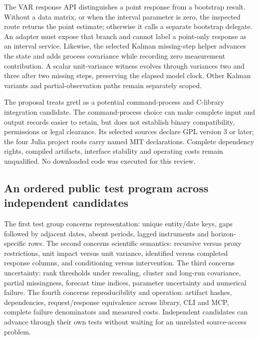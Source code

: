 The VAR response API distinguishes a point response from a bootstrap result. Without a data matrix, or when the interval parameter is zero, the inspected route returns the point estimate; otherwise it calls a separate bootstrap delegate. An adapter must expose that branch and cannot label a point-only response as an interval service. Likewise, the selected Kalman missing-step helper advances the state and adds process covariance while recording zero measurement contribution. A scalar unit-variance witness evolves through variances two and three after two missing steps, preserving the elapsed model clock. Other Kalman variants and partial-observation paths remain separately scoped.\citep{exec25_odyn_gretl,exec25_odyn_choice}

The proposal treats gretl as a potential command-process and C-library integration candidate. The command-process choice can make complete input and output records easier to retain, but does not establish binary compatibility, permissions or legal clearance. Its selected sources declare GPL version 3 or later; the four Julia project roots carry named MIT declarations. Complete dependency rights, compiled artifacts, interface stability and operating costs remain unqualified. No downloaded code was executed for this review.\citep{exec25_odyn_gretl,exec25_odyn_dpm,exec25_odyn_lp,exec25_odyn_macro,exec25_odyn_ssm}

\subsection{An ordered public test program across independent candidates}

The first test group concerns representation: unique entity/date keys, gaps followed by adjacent dates, absent periods, lagged instruments and horizon-specific rows. The second concerns scientific semantics: recursive versus proxy restrictions, unit impact versus unit variance, identified versus completed response columns, and conditioning versus intervention. The third concerns uncertainty: rank thresholds under rescaling, cluster and long-run covariance, partial missingness, forecast time indices, parameter uncertainty and numerical failure. The fourth concerns reproducibility and operation: artifact hashes, dependencies, request/response equivalence across library, CLI and MCP, complete failure denominators and measured costs. Independent candidates can advance through their own tests without waiting for an unrelated source-access problem.\citep{exec25_odyn_choice}

